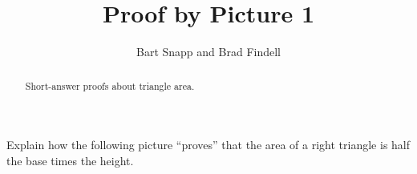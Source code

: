 \documentclass[nooutcomes]{ximera}
\title{Proof by Picture 1}
\author{Bart Snapp and Brad Findell}
\begin{document}
\begin{abstract}
Short-answer proofs about triangle area. 
\end{abstract}
\maketitle


\begin{problem}
Explain how the following picture ``proves'' that
  the area of a right triangle is half the base times the height.
%

\end{problem}
\end{document}
